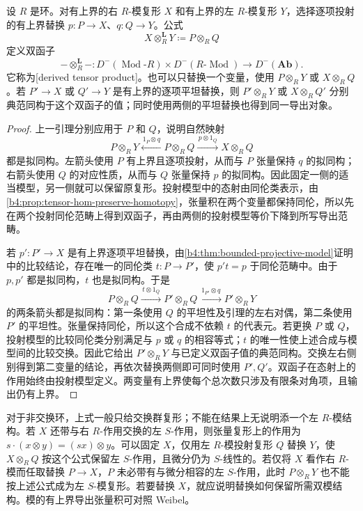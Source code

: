 \begin{theorem}\label{b4:thm:derived-tensor}
	设 \(R\) 是环。对有上界的右 \(R\)-模复形 \(X\) 和有上界的左 \(R\)-模复形 \(Y\)，选择逐项投射的有上界替换 \(p:P\to X\)、\(q:Q\to Y\)。公式
	\[
		X\otimes_R^{\mathbf L}Y\coloneqq P\otimes_RQ
	\]
	定义双函子
	\[
		-\otimes_R^{\mathbf L}-: D^-(\operatorname{Mod}\text{-}R)\times D^-(R\text{-}\operatorname{Mod}) \longrightarrow D^-(\mathbf{Ab}).
	\]
	它称为[derived tensor product]。也可以只替换一个变量，使用 \(P\otimes_RY\) 或 \(X\otimes_RQ\)。若 \(P'\to X\) 或 \(Q'\to Y\) 是有上界的逐项平坦替换，则 \(P'\otimes_RY\) 或 \(X\otimes_RQ'\) 分别典范同构于这个双函子的值；同时使用两侧的平坦替换也得到同一导出对象。
\end{theorem}
\begin{proof}
	上一引理分别应用于 \(P\) 和 \(Q\)，说明自然映射
	\[
		P\otimes_RY\xleftarrow{\,1_P\otimes q\,}P\otimes_RQ \xrightarrow{\,p\otimes1_Q\,}X\otimes_RQ
	\]
	都是拟同构。左箭头使用 \(P\) 有上界且逐项投射，从而与 \(P\) 张量保持 \(q\) 的拟同构；右箭头使用 \(Q\) 的对应性质，从而与 \(Q\) 张量保持 \(p\) 的拟同构。因此固定一侧的适当模型，另一侧就可以保留原复形。投射模型中的态射由同伦类表示，由\cref{b4:prop:tensor-hom-preserve-homotopy}，张量积在两个变量都保持同伦，所以先在两个投射同伦范畴上得到双函子，再由两侧的投射模型等价下降到所写导出范畴。

	若 \(p':P'\to X\) 是有上界逐项平坦替换，由\cref{b4:thm:bounded-projective-model}证明中的比较结论，存在唯一的同伦类 \(t:P\to P'\)，使 \(p't=p\) 于同伦范畴中。由于 \(p,p'\) 都是拟同构，\(t\) 也是拟同构。于是
	\[
		P\otimes_RQ \xrightarrow{\,t\otimes1_Q\,}P'\otimes_RQ \xrightarrow{\,1_{P'}\otimes q\,}P'\otimes_RY
	\]
	的两条箭头都是拟同构：第一条使用 \(Q\) 的平坦性及引理的左右对偶，第二条使用 \(P'\) 的平坦性。张量保持同伦，所以这个合成不依赖 \(t\) 的代表元。若更换 \(P\) 或 \(Q\)，投射模型的比较同伦类分别满足与 \(p\) 或 \(q\) 的相容等式；\(t\) 的唯一性使上述合成与模型间的比较交换。因此它给出 \(P'\otimes_RY\) 与已定义双函子值的典范同构。交换左右侧别得到第二变量的结论，再依次替换两侧即可同时使用 \(P',Q'\)。双函子在态射上的作用始终由投射模型定义。两变量有上界使每个总次数只涉及有限条对角项，且输出仍有上界。
\end{proof}

对于非交换环，上式一般只给交换群复形；不能在结果上无说明添一个左 \(R\)-模结构。若 \(X\) 还带与右 \(R\)-作用交换的左 \(S\)-作用，则张量复形上的作用为 \(s\cdot(x\otimes y)=(sx)\otimes y\)。可以固定 \(X\)，仅用左 \(R\)-模投射复形 \(Q\) 替换 \(Y\)，使 \(X\otimes_RQ\) 按这个公式保留左 \(S\)-作用，且微分仍为 \(S\)-线性的。若仅将 \(X\) 看作右 \(R\)-模而任取替换 \(P\to X\)，\(P\) 未必带有与微分相容的左 \(S\)-作用，此时 \(P\otimes_RY\) 也不能按上述公式成为左 \(S\)-模复形。若要替换 \(X\)，就应说明替换如何保留所需双模结构。模的有上界导出张量积可对照 Weibel\cite[Definition 10.6.1, Lemma 10.6.2, Theorem 10.6.3]{Weibel1994HomologicalAlgebra}。

